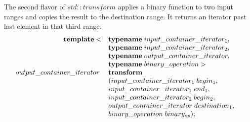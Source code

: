 \documentclass[12pt,fleqn]{article}
\begin{document}
\begin{comment}
\begin{lstlisting}[caption=using std;:bind to combine functions, label=combine ]
[...]
std::function< std::function <int(int)>(int)> cplus   = [] (int x) {
    return [=] (int y) {
      return 4 * x + y;
    };
  };

 auto l = std::bind([](std::function<int(int)> f){return f(2);},
		     std::bind(cplus, std::placeholders::_1));

  map(show, map(l, L)); //prints 6,270,358,94,182,6,14,398,-358,

\end{lstlisting}
Listing \ref{combine} illustrates how function combination can be used to limit the number of iterations and list copies.
The resulting function $l$ is then mapped over list $L$.
The inner bind takes the function $cplus$ as the first argument and has a placeholder $\_1$ as the second argument.
The callable object returned by the inner bind is then used as the argument input to the function of the outer bind. 
The function of the outer bind is a lambda which has a function as input.
In the body of the lambda this function is called with 2 and it's result is returned.
The resulting callable object $l$ is the function is $f(x)\ = 4 * x + 2$.
The placeholder is bound to the first argument of $cplus$ and 2 is used as the value for the second argument.
The result of mapping is printed to std::cout and the output is shown in the comment. 
Note that 94 the result of 4 * 23 + 2, 182 the result of 4 * 45 + 2 etc.
\end{comment}
%
%
The second flavor of $std::transform$ applies a binary function to two input ranges and copies the result to the destination range. 
It returns an iterator past last element in that third range.
\[
\begin{array}{rll}
\mbox{\bf template}<& \mbox{\bf typename}\; input\_container\_iterator_1, \\
                &\mbox{\bf typename}\; input\_container\_iterator_2, \\
               &\mbox{\bf typename} \; output \_container\_iterator, \\
             &\mbox{\bf typename} \; binary\_operation> &\\
output\_container\_iterator\;& \mbox{\bf transform}\\
&( input\_container\_iterator_1\; begin_1, \\
& input\_container\_iterator_1 \; end_1, \\
&input\_container\_iterator_2\; begin_2, \\
& output\_container\_iterator \; destination_1, \\
& binary\_operation \; binary_{op} );
\end{array}
\]
\end{document}
